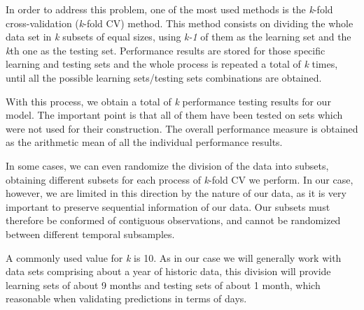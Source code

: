 \documentclass[a4paper,12pt]{article}
\begin{document}
In order to address this problem, one of the most used methods is the \textit{k}-fold cross-validation (\textit{k}-fold CV) method. This method consists on dividing the whole data set in \textit{k} subsets of equal sizes, using \textit{k-1} of them as the learning set and the \textit{k}th one as the testing set. Performance results are stored for those specific learning and testing sets and the whole process is repeated a total of \textit{k} times, until all the possible learning sets/testing sets combinations are obtained.

With this process, we obtain a total of \textit{k} performance testing results for our model. The important point is that all of them have been tested on sets which were not used for their construction. The overall performance measure is obtained as the arithmetic mean of all the individual performance results.

In some cases, we can even randomize the division of the data into subsets, obtaining different subsets for each process of \textit{k}-fold CV we perform. In our case, however, we are limited in this direction by the nature of our data, as it is very important to preserve sequential information of our data. Our subsets must therefore be conformed of contiguous observations, and cannot be randomized between different temporal subsamples.

A commonly used value for \textit{k} is 10. As in our case we will generally work with data sets comprising about a year of historic data, this division will provide learning sets of about 9 months and testing sets of about 1 month, which reasonable when validating predictions in terms of days.


\clearpage

 

\end{document}

